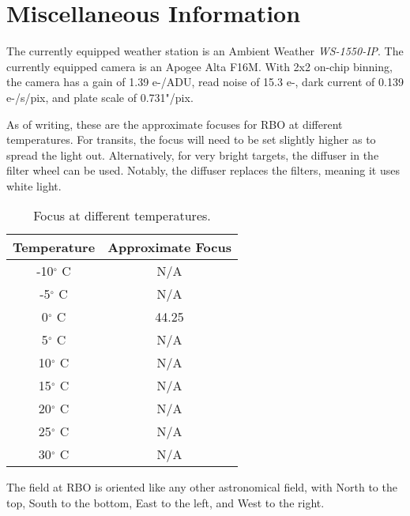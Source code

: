 \documentclass[letterpaper,12pt]{article}
\begin{document}
\section{Miscellaneous Information}\label{app:misc}
The currently equipped weather station is an Ambient Weather \textit{WS-1550-IP}.
The currently equipped camera is an Apogee Alta F16M. With 2x2 on-chip binning, the camera has a gain of 1.39 e-/ADU, read noise of 15.3 e-, dark current of 0.139 e-/s/pix, and plate scale of 0.731"/pix.
\par As of writing, these are the approximate focuses for RBO at different temperatures. For transits, the focus will need to be set slightly higher as to spread the light out. Alternatively, for very bright targets, the diffuser in the filter wheel can be used. Notably, the diffuser replaces the filters, meaning it uses white light.

\begin{table}[H]
	\caption{\label{tab:temp}Focus at different temperatures.}
	\begin{center}
			\begin{tabular}{c|c}
				Temperature	& Approximate Focus\\\hline
				-10$^\circ$ C 		& N/A\\
				-5$^\circ$ C 		& N/A\\
				0$^\circ$ C 		& 44.25\\
		 		5$^\circ$ C 		& N/A\\
				10$^\circ$ C 		& N/A\\
				15$^\circ$ C 		& N/A\\
				20$^\circ$ C 		& N/A\\
				25$^\circ$ C 		& N/A\\
				30$^\circ$ C 		& N/A\\
			\end{tabular}
	\end{center}
\end{table}

\par The field at RBO is oriented like any other astronomical field, with North to the top, South to the bottom, East to the left, and West to the right.\par
\end{document}
